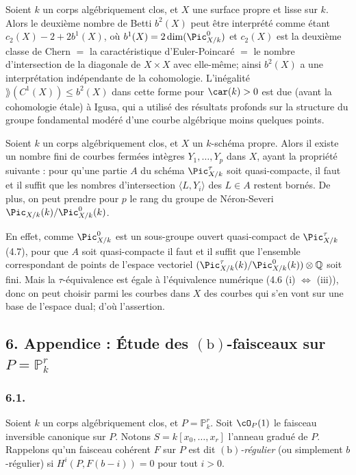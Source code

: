 \begin{remarque}[5.3]
Soient $k$ un corps alg\'ebriquement clos, et $X$ une surface propre et lisse sur $k$. Alors le deuxi\`eme nombre de Betti $b^2(X)$ peut \^etre interpr\'et\'e comme \'etant $c_2(X) - 2 + 2b^1(X)$, o\`u $b^1(X) = 2 \dim(\Pic^0_{X/k})$ et $c_2(X)$ est la deuxi\`eme classe de Chern $=$ la caract\'eristique d'Euler-Poincar\'e $=$ le nombre d'intersection de la diagonale de $X \times X$ avec elle-m\^eme; ainsi $b^2(X)$ a une interpr\'etation ind\'ependante de la cohomologie. L'in\'egalit\'e $\rang(C^1(X)) \leq b^2(X)$ dans cette forme pour $\car(k) > 0$ est due (avant la cohomologie \'etale) \`a Igusa, qui a utilis\'e des r\'esultats profonds sur la structure du groupe fondamental mod\'er\'e d'une courbe alg\'ebrique moins quelques points.
\end{remarque}

\begin{theoreme}[5.4]
Soient $k$ un corps alg\'ebriquement clos, et $X$ un $k$-sch\'ema propre. Alors il existe un nombre fini de courbes ferm\'ees int\`egres $Y_1, \dots, Y_p$ dans $X$, ayant la propri\'et\'e suivante : pour qu'une partie $A$ du sch\'ema $\Pic^\tau_{X/k}$ soit quasi-compacte, il faut et il suffit que les nombres d'intersection $\langle L, Y_i \rangle$ des $L \in A$ restent born\'es. De plus, on peut prendre pour $p$ le rang du groupe de N\'eron-Severi $\Pic_{X/k}(k)/\Pic^{0}_{X/k}(k)$.
\end{theoreme}

En effet, comme $\Pic^0_{X/k}$ est un sous-groupe ouvert quasi-compact de $\Pic^\tau_{X/k}$ (4.7), pour que $A$ soit quasi-compacte il faut et il suffit que l'ensemble correspondant de points de l'espace vectoriel $(\Pic^\tau_{X/k}(k)/\Pic^0_{X/k}(k)) \otimes \mathbb{Q}$ soit fini. Mais la $\tau$-\'equivalence est \'egale \`a l'\'equivalence num\'erique (4.6 (i) $\Leftrightarrow$ (iii)), donc on peut choisir parmi les courbes dans $X$ des courbes qui s'en vont sur une base de l'espace dual; d'o\`u l'assertion.


\newpage
\subsection*{6. Appendice : \'Etude des $\mathrm{(b)}$-faisceaux sur $P = \mathbb{P}^r_k$}

\subsubsection*{6.1.}
Soient $k$ un corps alg\'ebriquement clos, et $P = \mathbb{P}^r_k$. Soit $\cO_P(1)$ le faisceau inversible canonique sur $P$. Notons $S = k[x_0, \dots, x_r]$ l'anneau gradu\'e de $P$. Rappelons qu'un faisceau coh\'erent $F$ sur $P$ est dit \emph{$\mathrm{(b)}$-r\'egulier} (ou simplement $b$-r\'egulier) si $H^i(P, F(b-i)) = 0$ pour tout $i > 0$.

